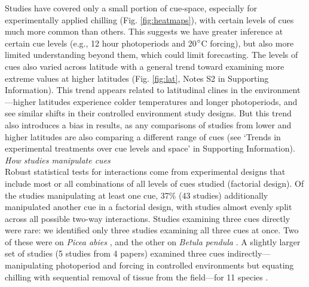 \documentclass[11pt,letter]{article}
\begin{document}
Studies have covered only a small portion of cue-space, especially for experimentally applied chilling (Fig. \ref{fig:heatmaps}), with certain levels of cues much more common than others. This suggests we have greater inference at certain cue levels (e.g., 12 hour photoperiods and 20$\degree$C forcing), but also more limited understanding beyond them, which could limit forecasting. The levels of cues also varied across latitude with a general trend toward examining more extreme values at higher latitudes (Fig. \ref{fig:lat}, Notes S2 in Supporting Information). This trend appears related to latitudinal clines in the environment---higher latitudes experience colder temperatures and longer photoperiods, and see similar shifts in their controlled environment study designs. But this trend also introduces a bias in results, as any comparisons of studies from lower and higher latitudes are also comparing a different range of cues (see `Trends in experimental treatments over cue levels and space' in Supporting Information). \\

\emph{How studies manipulate cues}\\ %
Robust statistical tests for interactions come from experimental designs that include most or all combinations of all levels of cues studied (factorial design). Of the studies manipulating at least one cue, 37\%  (43 studies) additionally manipulated another cue in a factorial design, with studies almost evenly split across all possible two-way interactions. Studies examining three cues directly were rare: we identified only three studies examining all three cues at once. Two of these were on \emph{Picea abies} \citep{Worrall:1967aa,Sogaard:2008aa}, and the other on \emph{Betula pendula} \citep{Skuterud:1994aa}. A slightly larger set of studies (5 studies from 4 papers) examined three cues indirectly---manipulating photoperiod and forcing in controlled environments but equating chilling with sequential removal of tissue from the field---for 11 species \citep{Schnabel:1987aa,Heide:1993,Partanen:1998aa,Basler:2014aa}. \\
\end{document}
